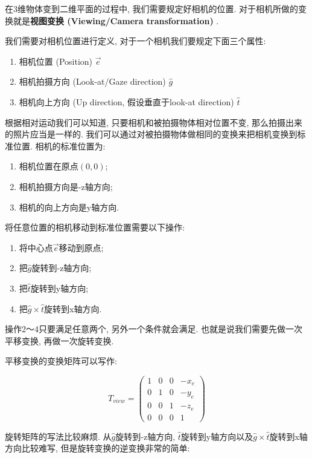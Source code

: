 \documentclass[openany]{progbookcn}
\begin{document}
在3维物体变到二维平面的过程中, 我们需要规定好相机的位置. 对于相机所做的变换就是\textbf{视图变换 (Viewing/Camera transformation) }. 

我们需要对相机位置进行定义, 对于一个相机我们要规定下面三个属性: 
\begin{enumerate}
	\item 相机位置 (Position) $\overrightarrow{e}$
	\item 相机拍摄方向 (Look-at/Gaze direction) $\hat{g}$
	\item 相机向上方向 (Up direction, 假设垂直于look-at direction) $\hat{t}$
\end{enumerate}

根据相对运动我们可以知道, 只要相机和被拍摄物体相对位置不变, 那么拍摄出来的照片应当是一样的. 我们可以通过对被拍摄物体做相同的变换来把相机变换到标准位置. 相机的标准位置为: 
\begin{enumerate}
	\item 相机位置在原点$(0,0)$; 
	\item 相机拍摄方向是-z轴方向; 
	\item 相机的向上方向是y轴方向. 
\end{enumerate}

将任意位置的相机移动到标准位置需要以下操作: 

\begin{enumerate}
	\item 将中心点$\overrightarrow{e}$移动到原点; 
	\item 把$\hat{g}$旋转到-z轴方向; 
	\item 把$\hat{t}$旋转到y轴方向; 
	\item 把$\hat{g}\times\hat{t}$旋转到x轴方向. 
\end{enumerate}

操作2～4只要满足任意两个, 另外一个条件就会满足. 也就是说我们需要先做一次平移变换, 再做一次旋转变换. 

平移变换的变换矩阵可以写作: 

\begin{equation}
	T_{view}=\begin{pmatrix}1&0&0&-x_e\\0&1&0&-y_e\\0&0&1&-z_e\\0&0&0&1\end{pmatrix}
\end{equation}

旋转矩阵的写法比较麻烦. 从$\hat{g}$旋转到-z轴方向, $\hat{t}$旋转到y轴方向以及$\hat{g}\times\hat{t}$旋转到x轴方向比较难写, 但是旋转变换的逆变换非常的简单: 
\end{document}
